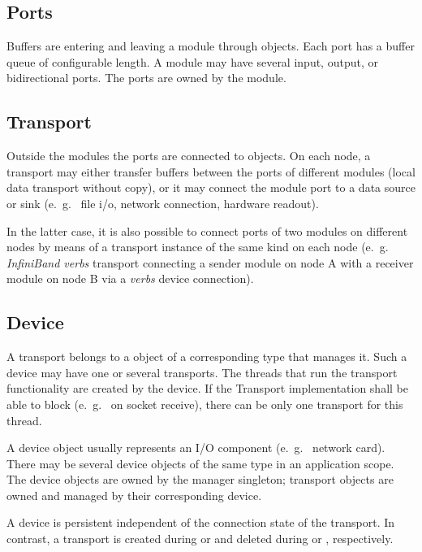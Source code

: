 \subsection{Ports}
Buffers are entering and leaving a module through 
  objects. 
Each port has a buffer queue of configurable length.
A module may have several input, output,  
or bidirectional ports. The ports are owned by the module.

\subsection{Transport}
Outside the modules the ports are connected to 
  objects.
On each node, a transport may either transfer buffers between 
the ports of different modules (local data transport without copy), 
or it may connect the module port to a data 
source or sink (e.~g.~ file i/o, network connection, hardware readout).

In the latter case, it is also possible  to connect ports of two modules on 
different nodes by means of a transport instance of the same kind on 
each node (e.~g.~ {\em InfiniBand verbs} transport connecting a sender module on node A with a receiver
module on node B via a {\em verbs} device connection).

\subsection{Device}
A transport belongs to a  
 object of a 
corresponding type that manages it. Such a device may have one or several transports.  
The threads that run the transport functionality are
created by the device. If the Transport implementation 
shall be able to block (e.~g.~ on socket receive), there can be only 
one transport for this thread. 

A device object usually represents an I/O component (e.~g.~ network card). 
There may be several device objects of the same 
type in an application scope. 
The device objects are owned by the manager 
singleton; transport objects are owned and managed by their corresponding device.  

A device is persistent independent of the connection state 
of the transport. In contrast, a transport is created 
during  or 
and deleted during  or , respectively. 

